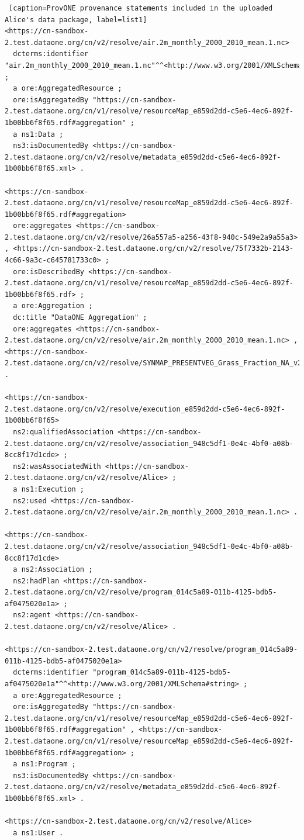 \documentclass[a4paper]{llncs}
\begin{document}
\begin{appendix}
\begin{lstlisting} [caption=ProvONE provenance statements included in the uploaded Alice's data package, label=list1]
<https://cn-sandbox-2.test.dataone.org/cn/v2/resolve/air.2m_monthly_2000_2010_mean.1.nc>
  dcterms:identifier "air.2m_monthly_2000_2010_mean.1.nc"^^<http://www.w3.org/2001/XMLSchema#string> ;
  a ore:AggregatedResource ;
  ore:isAggregatedBy "https://cn-sandbox-2.test.dataone.org/cn/v1/resolve/resourceMap_e859d2dd-c5e6-4ec6-892f-1b00bb6f8f65.rdf#aggregation" ;
  a ns1:Data ;
  ns3:isDocumentedBy <https://cn-sandbox-2.test.dataone.org/cn/v2/resolve/metadata_e859d2dd-c5e6-4ec6-892f-1b00bb6f8f65.xml> .

<https://cn-sandbox-2.test.dataone.org/cn/v1/resolve/resourceMap_e859d2dd-c5e6-4ec6-892f-1b00bb6f8f65.rdf#aggregation> 
  ore:aggregates <https://cn-sandbox-2.test.dataone.org/cn/v2/resolve/26a557a5-a256-43f8-940c-549e2a9a55a3> , <https://cn-sandbox-2.test.dataone.org/cn/v2/resolve/75f7332b-2143-4c66-9a3c-c645781733c0> ;
  ore:isDescribedBy <https://cn-sandbox-2.test.dataone.org/cn/v1/resolve/resourceMap_e859d2dd-c5e6-4ec6-892f-1b00bb6f8f65.rdf> ;
  a ore:Aggregation ;
  dc:title "DataONE Aggregation" ;
  ore:aggregates <https://cn-sandbox-2.test.dataone.org/cn/v2/resolve/air.2m_monthly_2000_2010_mean.1.nc> , <https://cn-sandbox-2.test.dataone.org/cn/v2/resolve/SYNMAP_PRESENTVEG_Grass_Fraction_NA_v2.0.nc> .

<https://cn-sandbox-2.test.dataone.org/cn/v2/resolve/execution_e859d2dd-c5e6-4ec6-892f-1b00bb6f8f65>
  ns2:qualifiedAssociation <https://cn-sandbox-2.test.dataone.org/cn/v2/resolve/association_948c5df1-0e4c-4bf0-a08b-8cc8f17d1cde> ;
  ns2:wasAssociatedWith <https://cn-sandbox-2.test.dataone.org/cn/v2/resolve/Alice> ;
  a ns1:Execution ;
  ns2:used <https://cn-sandbox-2.test.dataone.org/cn/v2/resolve/air.2m_monthly_2000_2010_mean.1.nc> .

<https://cn-sandbox-2.test.dataone.org/cn/v2/resolve/association_948c5df1-0e4c-4bf0-a08b-8cc8f17d1cde>
  a ns2:Association ;
  ns2:hadPlan <https://cn-sandbox-2.test.dataone.org/cn/v2/resolve/program_014c5a89-011b-4125-bdb5-af0475020e1a> ;
  ns2:agent <https://cn-sandbox-2.test.dataone.org/cn/v2/resolve/Alice> .

<https://cn-sandbox-2.test.dataone.org/cn/v2/resolve/program_014c5a89-011b-4125-bdb5-af0475020e1a>
  dcterms:identifier "program_014c5a89-011b-4125-bdb5-af0475020e1a"^^<http://www.w3.org/2001/XMLSchema#string> ;
  a ore:AggregatedResource ;
  ore:isAggregatedBy "https://cn-sandbox-2.test.dataone.org/cn/v1/resolve/resourceMap_e859d2dd-c5e6-4ec6-892f-1b00bb6f8f65.rdf#aggregation" , <https://cn-sandbox-2.test.dataone.org/cn/v1/resolve/resourceMap_e859d2dd-c5e6-4ec6-892f-1b00bb6f8f65.rdf#aggregation> ;
  a ns1:Program ;
  ns3:isDocumentedBy <https://cn-sandbox-2.test.dataone.org/cn/v2/resolve/metadata_e859d2dd-c5e6-4ec6-892f-1b00bb6f8f65.xml> .

<https://cn-sandbox-2.test.dataone.org/cn/v2/resolve/Alice>
  a ns1:User .
\end{lstlisting}

\end{appendix}
\end{document}
